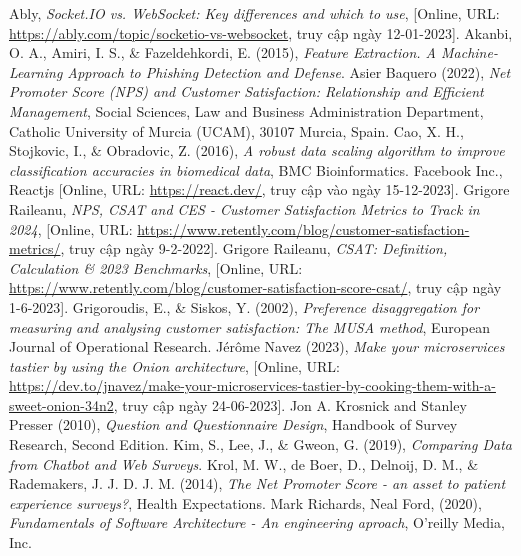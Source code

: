 \begin{thebibliography}{9}
     Ably, \textit{Socket.IO vs. WebSocket: Key differences and which to use}, [Online, URL: \url{https://ably.com/topic/socketio-vs-websocket}, truy cập ngày 12-01-2023].
     Akanbi, O. A., Amiri, I. S., \& Fazeldehkordi, E. (2015), \textit{Feature Extraction. A Machine-Learning Approach to Phishing Detection and Defense}.
     Asier Baquero (2022), \textit{Net Promoter Score (NPS) and Customer Satisfaction: Relationship and Efficient Management}, Social Sciences, Law and Business Administration Department, Catholic University of Murcia (UCAM), 30107 Murcia, Spain.
     Cao, X. H., Stojkovic, I., \& Obradovic, Z. (2016), \textit{A robust data scaling algorithm to improve classification accuracies in biomedical data}, BMC Bioinformatics.
     Facebook Inc., Reactjs [Online, URL: \url{https://react.dev/}, truy cập vào ngày 15-12-2023].
     Grigore Raileanu, \textit{NPS, CSAT and CES - Customer Satisfaction Metrics to Track in 2024}, [Online, URL: \url{https://www.retently.com/blog/customer-satisfaction-metrics/}, truy cập ngày 9-2-2022].
     Grigore Raileanu, \textit{CSAT: Definition, Calculation \& 2023 Benchmarks}, [Online, URL: \url{https://www.retently.com/blog/customer-satisfaction-score-csat/}, truy cập ngày 1-6-2023].
     Grigoroudis, E., \& Siskos, Y. (2002), \textit{Preference disaggregation for measuring and analysing customer satisfaction: The MUSA method}, European Journal of Operational Research.
     Jérôme Navez (2023), \textit{Make your microservices tastier by using the Onion architecture}, [Online, URL: \href{https://dev.to/jnavez/make-your-microservices-tastier-by-cooking-them-with-a-sweet-onion-34n2}{https://dev.to/jnavez/make-your-microservices-tastier-by-cooking-them-with-a-sweet-onion-34n2}, truy cập ngày 24-06-2023].
     Jon A. Krosnick and Stanley Presser (2010), \textit{Question and Questionnaire Design}, Handbook of Survey Research, Second Edition.
     Kim, S., Lee, J., \& Gweon, G. (2019), \textit{Comparing Data from Chatbot and Web Surveys}.
     Krol, M. W., de Boer, D., Delnoij, D. M., \& Rademakers, J. J. D. J. M. (2014), \textit{The Net Promoter Score - an asset to patient experience surveys?}, Health Expectations.
     Mark Richards, Neal Ford, (2020), \textit{Fundamentals of Software Architecture - An engineering aproach}, O’reilly Media, Inc.

\end{thebibliography}
